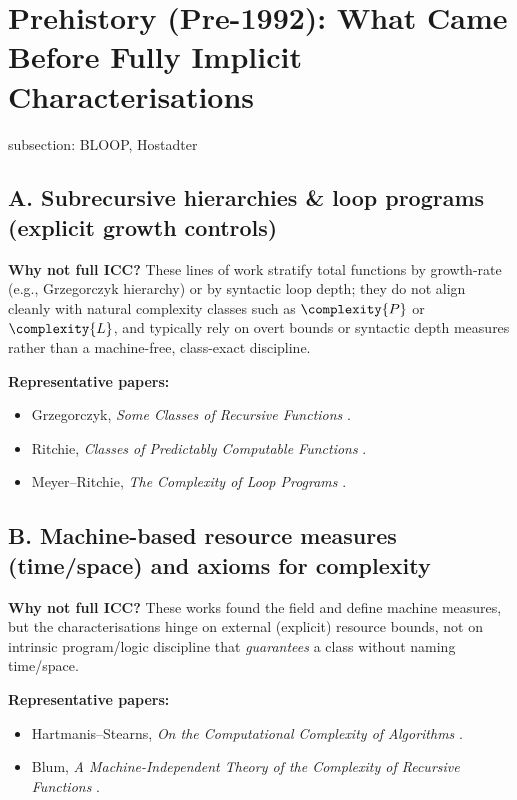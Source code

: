 
\section{Prehistory (Pre-1992): What Came Before Fully Implicit Characterisations}


subsection:
BLOOP, Hostadter


\subsection*{A. Subrecursive hierarchies \& loop programs (explicit growth controls)}
\textbf{Why not full ICC?} These lines of work stratify total functions by growth-rate
(e.g., Grzegorczyk hierarchy) or by syntactic loop depth; they do not align cleanly with
natural complexity classes such as \(\complexity{P}\) or \(\complexity{L}\), and typically rely on overt
bounds or syntactic depth measures rather than a machine-free, class-exact discipline.

\noindent\textbf{Representative papers:}
\begin{itemize}
  \item Grzegorczyk, \emph{Some Classes of Recursive Functions} \cite{Grzegorczyk1953}.
  \item Ritchie, \emph{Classes of Predictably Computable Functions} \cite{Ritchie1963}.
  \item Meyer--Ritchie, \emph{The Complexity of Loop Programs} \cite{MeyerRitchie1967}.
\end{itemize}

\subsection*{B. Machine-based resource measures (time/space) and axioms for complexity}
\textbf{Why not full ICC?} These works found the field and define machine measures, but
the characterisations hinge on external (explicit) resource bounds, not on intrinsic
program/logic discipline that \emph{guarantees} a class without naming time/space.

\noindent\textbf{Representative papers:}
\begin{itemize}
  \item Hartmanis--Stearns, \emph{On the Computational Complexity of Algorithms} \cite{HartmanisStearns1965}.
  \item Blum, \emph{A Machine-Independent Theory of the Complexity of Recursive Functions} \cite{Blum1967}.
\end{itemize}

